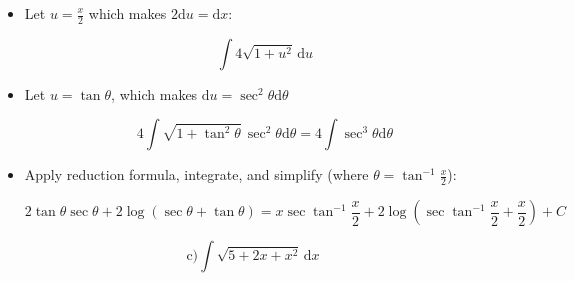 \documentclass[11pt]{article}
\begin{document}
\begin{itemize}

\item Let $u = \frac{x}{2}$ which makes $2\mathrm{d}u = \mathrm{d}x$:

\begin{equation*} 
\int \! 4\sqrt{1 + u^2} \, \mathrm{d}u
\end{equation*}

\item Let $u = \tan\theta$, which makes $\mathrm{d}u = \sec^2\theta\mathrm{d}\theta$

\begin{equation*} 
4\int \!\sqrt{1 + \tan^2\theta} \, \sec^2\theta\mathrm{d}\theta = 
4 \int \! \sec^3\theta\mathrm{d}\theta
\end{equation*}

\item Apply reduction formula, integrate, and simplify (where $\theta = \tan^{-1}\frac{x}{2}$):

\begin{equation*} 
2\tan\theta\sec\theta + 2 \log(\sec\theta + \tan\theta) = 
x\sec\tan^{-1}\frac{x}{2} + 
2\log(\sec\tan^{-1}\frac{x}{2} + \frac{x}{2}) + C
\end{equation*}

\end{itemize}

\pagebreak

\begin{equation*} 
\mathrm{c)} \int \! \sqrt{5 + 2x + x^2} \, \mathrm{d}x
\end{equation*}
\end{document}

